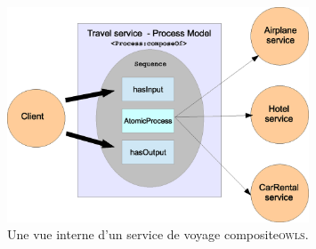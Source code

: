 \begin{figure}[h]
    \centering
    \includegraphics[width=0.8\textwidth]{figs/owls_travel_example_schema.eps}
    \caption{Une vue interne d'un service de
      voyage composite\textsc{owls}.}
    \label{fig:owls-travel-example-schema}
\end{figure}
